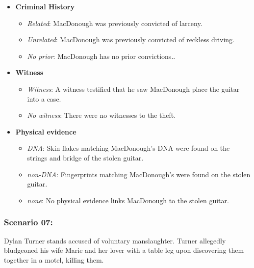 \documentclass[
]{article}
\providecommand{\tightlist}{%
  \setlength{\itemsep}{0pt}\setlength{\parskip}{0pt}}
\begin{document}
\begin{itemize}
\tightlist
\item
  \textbf{Criminal History}

  \begin{itemize}
  \tightlist
  \item
    \emph{Related}: MacDonough was previously convicted of larceny.
  \item
    \emph{Unrelated}: MacDonough was previously convicted of reckless
    driving.
  \item
    \emph{No prior}: MacDonough has no prior convictions..
  \end{itemize}
\item
  \textbf{Witness}

  \begin{itemize}
  \tightlist
  \item
    \emph{Witness}: A witness testified that he saw MacDonough place the
    guitar into a case.
  \item
    \emph{No witness}: There were no witnesses to the theft.
  \end{itemize}
\item
  \textbf{Physical evidence}

  \begin{itemize}
  \tightlist
  \item
    \emph{DNA}: Skin flakes matching MacDonough's DNA were found on the
    strings and bridge of the stolen guitar.
  \item
    \emph{non-DNA}: Fingerprints matching MacDonough's were found on the
    stolen guitar.
  \item
    \emph{none}: No physical evidence links MacDonough to the stolen
    guitar.
  \end{itemize}
\end{itemize}

\hypertarget{scenario-07}{%
\subsubsection{Scenario 07:}\label{scenario-07}}

Dylan Turner stands accused of voluntary manslaughter. Turner allegedly
bludgeoned his wife Marie and her lover with a table leg upon
discovering them together in a motel, killing them.
\end{document}
